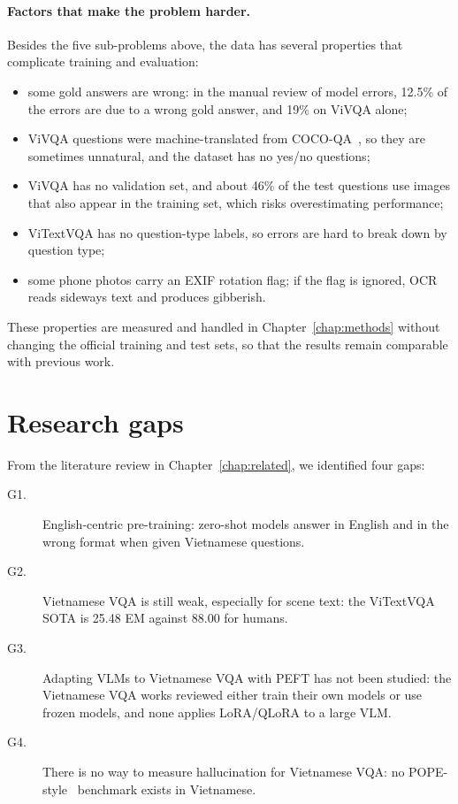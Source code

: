 \paragraph{Factors that make the problem harder.} Besides the five sub-problems
above, the data has several properties that complicate training and evaluation:

\begin{itemize}
  \item some gold answers are wrong: in the manual review of model errors, 12.5\% of
  the errors are due to a wrong gold answer, and 19\% on ViVQA alone;
  \item ViVQA questions were machine-translated from COCO-QA~\cite{ren2015cocoqa}, so
  they are sometimes unnatural, and the dataset has no yes/no questions;
  \item ViVQA has no validation set, and about 46\% of the test questions use images
  that also appear in the training set, which risks overestimating performance;
  \item ViTextVQA has no question-type labels, so errors are hard to break down by
  question type;
  \item some phone photos carry an EXIF rotation flag; if the flag is ignored, OCR
  reads sideways text and produces gibberish.
\end{itemize}

These properties are measured and handled in Chapter~\ref{chap:methods} without
changing the official training and test sets, so that the results remain
comparable with previous work.

\section{Research gaps}
\label{sec:intro-gaps}

From the literature review in Chapter~\ref{chap:related}, we identified four
gaps:

\begin{description}
  \item[G1.] English-centric pre-training: zero-shot models answer in English and in
  the wrong format when given Vietnamese questions.
  \item[G2.] Vietnamese VQA is still weak, especially for scene text: the ViTextVQA
  SOTA is 25.48 EM against 88.00 for humans.
  \item[G3.] Adapting VLMs to Vietnamese VQA with PEFT has not been studied: the
  Vietnamese VQA works reviewed either train their own models or use frozen models,
  and none applies LoRA/QLoRA to a large VLM.
  \item[G4.] There is no way to measure hallucination for Vietnamese VQA: no
  POPE-style~\cite{li2023pope} benchmark exists in Vietnamese.
\end{description}


